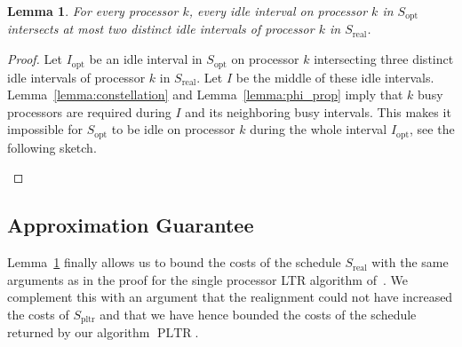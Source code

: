 \documentclass[a4paper]{article}
\DeclareMathOperator{\opt}{opt}
\DeclareMathOperator{\pltr}{pltr}
\DeclareMathOperator{\PLTR}{PLTR}
\DeclareMathOperator{\real}{real}
\newtheorem{lemma}[theorem]{Lemma}
\begin{document}
\begin{lemma}\label{lemma:intersection}
  For every processor $k$, every idle interval on processor $k$ in $S_{\opt}$ intersects at most two distinct idle intervals of processor $k$ in $S_{\real}$.
\end{lemma}
\begin{proof}
  Let $I_{\opt}$ be an idle interval in $S_{\opt}$ on processor $k$ intersecting three distinct idle intervals of processor $k$ in $S_{\real}$.
  Let $I$ be the middle of these idle intervals.
  Lemma~\ref{lemma:constellation} and Lemma~\ref{lemma:phi_prop} imply that $k$ busy processors are required during $I$ and its neighboring busy intervals.
  This makes it impossible for $S_{\opt}$ to be idle on processor $k$ during the whole interval $I_{\opt}$, see the following sketch.
  \begin{figure}[H]
    \centering
    
    \label{fig:lemma_intersection}
  \end{figure}
\end{proof}

\subsection{Approximation Guarantee}
Lemma~\ref{lemma:intersection} finally allows us to bound the costs of the schedule $S_{\real}$ with the same arguments as in the proof for the single processor LTR algorithm of~\cite{irani_left_to_right_soda_2003}.
We complement this with an argument that the realignment could not have increased the costs of $S_{\pltr}$ and that we have hence bounded the costs of the schedule returned by our algorithm $\PLTR$.
\end{document}
